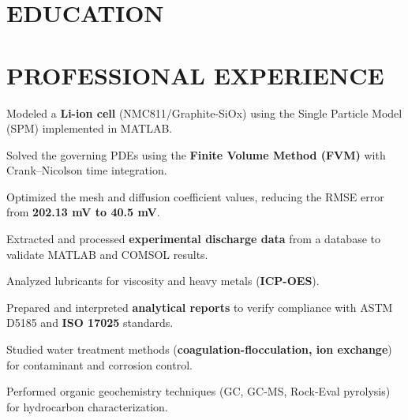 \documentclass[10pt]{article}
\begin{document}

\section{EDUCATION}

\section{PROFESSIONAL EXPERIENCE}
\begin{bul}
\item Modeled a \textbf{Li-ion cell} (NMC811/Graphite-SiOx) using the Single Particle Model (SPM) implemented in MATLAB.
\item Solved the governing PDEs using the \textbf{Finite Volume Method (FVM)} with Crank–Nicolson time integration.
\item Optimized the mesh and diffusion coefficient values, reducing the RMSE error from \textbf{202.13 mV to 40.5 mV}.
\item Extracted and processed \textbf{experimental discharge data} from a database to validate MATLAB and COMSOL results.
\end{bul}
\begin{bul}
\item Analyzed lubricants for viscosity and heavy metals (\textbf{ICP-OES}).
\item Prepared and interpreted \textbf{analytical reports} to verify compliance with ASTM D5185 and \textbf{ISO 17025} standards.
\end{bul}
\begin{bul}
\item Studied water treatment methods (\textbf{coagulation-flocculation, ion exchange}) for contaminant and corrosion control.
\item Performed organic geochemistry techniques (GC, GC-MS, Rock-Eval pyrolysis) for hydrocarbon characterization.
\end{bul}
\end{document}
